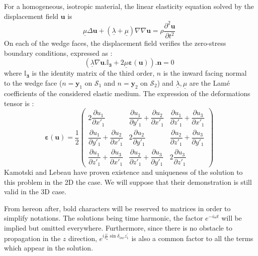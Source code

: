 For a homogeneous, isotropic material, the linear elasticity equation solved by the displacement field $\mathbf{u}$ is 
\begin{equation}
\underline{\mu} \Delta \mathbf{u} + (\underline{\lambda}+\underline{\mu})\nabla \nabla \mathbf{u} = \rho \frac{\partial^2 \mathbf{u}}{\partial t^2}
\label{C4:Elasticitelin}
\end{equation}
On each of the wedge faces, the displacement field verifies the zero-stress boundary conditions, expressed as :
\begin{equation}
(\underline{\lambda} \nabla \mathbf{u} .\mathbf{\mathbb{I}_3}+2\underline{\mu} \mathbf{\varepsilon} (\mathbf{u})).\mathbf{n}=0
\label{C4:stressfree}
\end{equation}
where $\mathbf{\mathbb{I}_3}$ is the identity matrix of the third order, $n$ is the inward facing normal to the wedge face ($n=\mathbf{y}_1$ on $\mathcal{S}_1$  and $n=\mathbf{y}_2$ on $\mathcal{S}_2$) and $\underline{\lambda}, \underline{\mu}$ are the Lamé coefficients of the considered elastic medium. The expression of the deformations tensor is :
\begin{equation}
\mathbf{\varepsilon}(\mathbf{u})=\frac{1}{2} \begin{pmatrix}
2\dfrac{\partial u_1}{\partial x'_1} & \dfrac{\partial u_1}{\partial y'_1}+\dfrac{\partial u_2}{\partial x'_1}&\dfrac{\partial u_1}{\partial z'_1}+\dfrac{\partial u_3}{\partial x'_1} \\
\dfrac{\partial u_1}{\partial y'_1}+\dfrac{\partial u_2}{\partial x'_1}&2\dfrac{\partial u_2}{\partial y'_1}&\dfrac{\partial u_2}{\partial z'_1}+\dfrac{\partial u_3}{\partial y'_1} \\
\dfrac{\partial u_1}{\partial z'_1}+\dfrac{\partial u_3}{\partial x'_1} &\dfrac{\partial u_2}{\partial z'_1}+\dfrac{\partial u_3}{\partial y'_1} & 2\dfrac{\partial u_3}{\partial z'_1}
\end{pmatrix}
\label{C4:mateps}
\end{equation}
Kamotski and Lebeau \cite{KamotskiLebeau} have proven existence and uniqueness of the solution to this problem in the 2D the case. We will suppose that their demonstration is still valid in the 3D case.

From hereon after, bold characters will be reserved to matrices in order to simplify notations. The solutions being time harmonic, the factor $e^{-i\omega t}$ will be implied but omitted everywhere. Furthermore, since there is no obstacle to propagation in the $z$ direction, $e^{i\frac{\omega}{c_{\alpha}}\sin\delta_{inc}z^{\prime}_1}$ is also a common factor to all the terms which appear in the solution.

